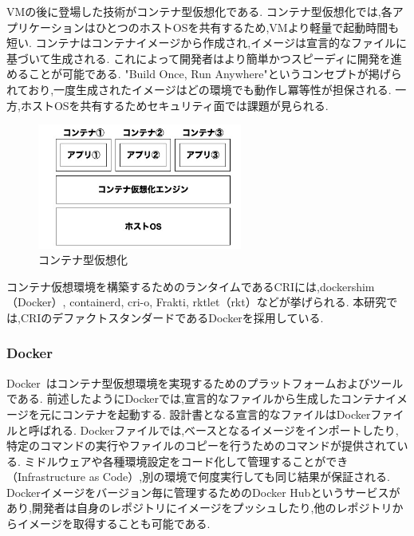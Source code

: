 VMの後に登場した技術がコンテナ型仮想化である.
コンテナ型仮想化では,各アプリケーションはひとつのホストOSを共有するため,VMより軽量で起動時間も短い.
コンテナはコンテナイメージから作成され,イメージは宣言的なファイルに基づいて生成される.
これによって開発者はより簡単かつスピーディに開発を進めることが可能である.
"Build Once, Run Anywhere"というコンセプトが掲げられており,一度生成されたイメージはどの環境でも動作し冪等性が担保される.
一方,ホストOSを共有するためセキュリティ面では課題が見られる.

\begin{figure}[htbp]
\begin{center}
    \includegraphics[width=0.6\textwidth]{./figures/docker-structure.jpg}
    \caption{コンテナ型仮想化}
\end{center}
\end{figure}

コンテナ仮想環境を構築するためのランタイムであるCRIには,dockershim（Docker）, containerd, cri-o, Frakti, rktlet（rkt）などが挙げられる.
本研究では,CRIのデファクトスタンダードであるDockerを採用している.

\subsubsection{Docker}
\label{background:container-orchestration-system:container:docker}

Docker~\cite{Docker}はコンテナ型仮想環境を実現するためのプラットフォームおよびツールである.
前述したようにDockerでは,宣言的なファイルから生成したコンテナイメージを元にコンテナを起動する.
設計書となる宣言的なファイルはDockerファイルと呼ばれる.
Dockerファイルでは,ベースとなるイメージをインポートしたり,特定のコマンドの実行やファイルのコピーを行うためのコマンドが提供されている.
ミドルウェアや各種環境設定をコード化して管理することができ（Infrastructure as Code）,別の環境で何度実行しても同じ結果が保証される.
Dockerイメージをバージョン毎に管理するためのDocker Hubというサービスがあり,開発者は自身のレポジトリにイメージをプッシュしたり,他のレポジトリからイメージを取得することも可能である.

